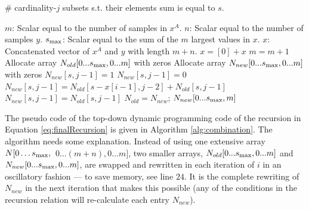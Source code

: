 \documentclass[a4paper]{article}
\begin{document}
\FloatBarrier
\begin{algorithm}
\caption{\# cardinality-$j$ subsets s.t. their elements sum is equal to $s$.}

\label{alg:combination}
\begin{algorithmic}[1]
\State $m$: Scalar equal to the number of samples in $x^{A}$.
\State $n$: Scalar equal to the number of samples $y$.
\State $s_{\rm max}$: Scalar equal to the sum of the $m$ largest values in $x$.
\State $x$: Concatenated vector of $x^{A}$ and $y$ with length $m+n$.
    \State $x=[0 ]+x$ 
    \State $m=m+1$ 
    \State Allocate array $N_{old}[0...s_{\rm max},0...m]$ with zeros
    \State Allocate array $N_{new}[0...s_{\rm max},0...m]$ with zeros
                  \State $N_{new}[s,j-1]=1$
                  \State $N_{new}[s,j-1]=0$
                  \State $N_{new}[s,j-1]=N_{old}[s-x[i-1],j-2] + N_{old}[s,j-1]$
                 \State $N_{new}[s,j-1]=N_{old}[s,j-1]$
                \EndIf
            \EndFor
        \EndFor
        \State $N_{old} = N_{new}$; 
    \EndFor
        \State \Return $N_{new}[0...s_{\rm max},m]$ 

    \EndProcedure
\end{algorithmic}
\end{algorithm}
\FloatBarrier

The pseudo code of the top-down dynamic programming code of the recursion in Equation \ref{eq:finalRecursion} is given in Algorithm \ref{alg:combination}. The algorithm needs some explanation. Instead of using one extensive array $N[0\ldots s_{\rm max},$\ $0\ldots(m+n),0\ldots m]$, two smaller arrays, $N_{old}[0...s_{\rm max},0...m]$ and $N_{new}[0...s_{\rm max},0...m]$, are swapped and rewritten in each iteration of $i$ in an oscillatory fashion --- to save memory, see line $24$. It is the complete rewriting of $N_{new}$ in the next iteration that makes this possible (any of the conditions in the recursion relation will re-calculate each entry $N_{new}$).
\end{document}
